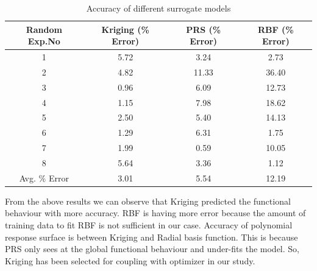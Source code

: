 \begin{table}[H]
	\caption{Accuracy of different surrogate models}
	\label{Accuracy of different surrogate models}
	\centering
	\begin{tabular}{cccc}
		\hline \hline
		Random Exp.No	&Kriging (\% Error)	&PRS (\% Error)	&RBF (\% Error) \\
		\hline \hline
		1 &5.72 &3.24	&2.73 \\
		2 &4.82	&11.33	&36.40 \\
		3 &0.96	&6.09	&12.73 \\
		4 &1.15	&7.98	&18.62 \\
		5 &2.50	&5.40	&14.13 \\
		6 &1.29	&6.31	&1.75 \\
		7 &1.99	&0.59	&10.05 \\
		8 &5.64	&3.36	&1.12 \\
		\hline \hline
		Avg. \% Error	& 3.01	& 5.54	& 12.19 \\
		\hline \hline
	\end{tabular}
\end{table}


From the above results we can observe that Kriging predicted the functional behaviour with more accuracy. RBF is having more error because the amount of training data to fit RBF is not sufficient in our case. Accuracy of polynomial response surface is between Kriging and Radial basis function. This is because PRS only sees at the global functional behaviour and under-fits the model. So, Kriging has been selected for coupling with optimizer in our study.

